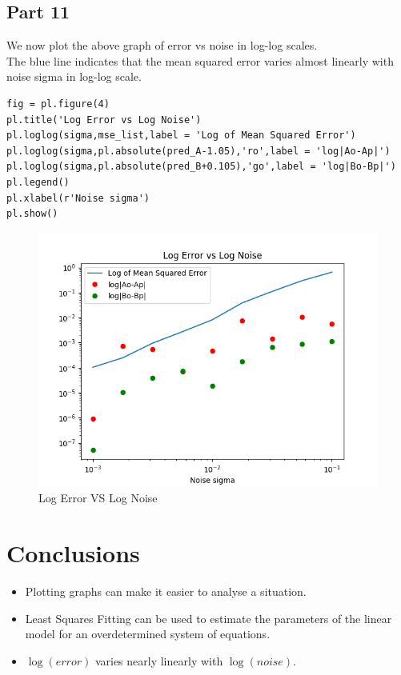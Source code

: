 \documentclass[11pt, a4paper]{article}
\begin{document}
\subsection{Part 11}
We now plot the above graph of error vs noise in log-log scales. \\
The blue line indicates that the mean squared error varies almost linearly with noise sigma in log-log scale.
\begin{verbatim}
fig = pl.figure(4)
pl.title('Log Error vs Log Noise')
pl.loglog(sigma,mse_list,label = 'Log of Mean Squared Error')
pl.loglog(sigma,pl.absolute(pred_A-1.05),'ro',label = 'log|Ao-Ap|')
pl.loglog(sigma,pl.absolute(pred_B+0.105),'go',label = 'log|Bo-Bp|')
pl.legend()
pl.xlabel(r'Noise sigma')
pl.show()
\end{verbatim}

\begin{figure}[!htb]
   	\centering
   	\includegraphics[scale=0.5]{loglogplot.png}
   	\caption{Log Error VS Log Noise}
   	\label{fig:loglogplot}
\end{figure}

\section{Conclusions}
\begin{itemize}
	\item Plotting graphs can make it easier to analyse a situation.
    \item Least Squares Fitting can be used to estimate the parameters of the linear model for an overdetermined system of equations.
    \item $\log(error)$ varies nearly linearly with $\log(noise)$.
\end{itemize}
\end{document}
